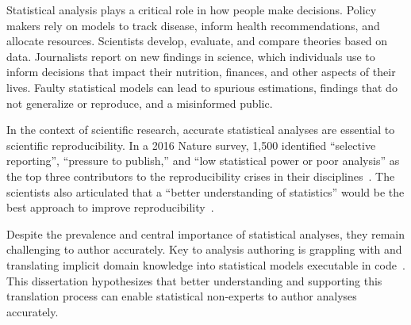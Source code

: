 
Statistical analysis plays a critical role in how people make decisions. Policy
makers rely on models to track disease, inform health recommendations, and
allocate resources. Scientists develop, evaluate, and compare theories based on
data. Journalists report on new findings in science, which
individuals use to inform decisions that impact their nutrition, finances, and
other aspects of their lives. Faulty statistical models can lead to spurious
estimations, findings that do not generalize or reproduce, and a misinformed
public. 


In the context of scientific research, accurate statistical analyses are
essential to scientific reproducibility. In a 2016 Nature survey, 1,500
identified ``selective reporting'', ``pressure to publish,'' and ``low
statistical power or poor analysis'' as the top three contributors to the
reproducibility crises in their disciplines~\cite{baker2016NatureSurvey}. The
scientists also articulated that a ``better understanding of statistics'' would
be the best approach to improve reproducibility~\cite{baker2016NatureSurvey}. 

Despite the prevalence and central importance of statistical analyses, they
remain challenging to author accurately. Key to analysis authoring is grappling
with and translating implicit domain knowledge into statistical models
executable in code~\cite{wild1999statisticalThinking,carver2016guidelines}. This
dissertation hypothesizes that better understanding and supporting this
translation process can enable statistical non-experts to author analyses
accurately. 


